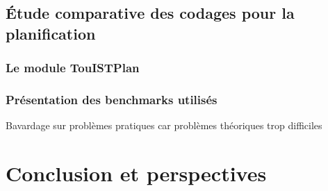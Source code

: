 \documentclass[a4paper,12pt,oneside]{extbook}
\begin{document}
\section{Étude comparative des codages pour la planification}

\subsection{Le module TouISTPlan}


\subsection{Présentation des benchmarks utilisés}
Bavardage sur problèmes pratiques car problèmes théoriques trop difficiles









\chapter{Conclusion et perspectives}\label{chap:conclusion}




\appendix

\printbibliography
\end{document}

